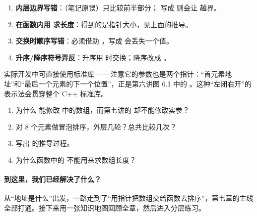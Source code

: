 \begin{warningbox}
\begin{enumerate}
  \item \textbf{内层边界写错}：（笔记原误）只比较前半部分； 写成  则会让  越界。
  \item \textbf{在函数内用  求长度}：得到的是指针大小，见上面的推导。
  \item \textbf{交换时顺序写错}：必须借助 ，写成  会丢失一个值。
  \item \textbf{升序/降序符号弄反}：升序用 \cc{>} 时交换；降序改成 \cc{<}。
\end{enumerate}
\end{warningbox}

\begin{extendbox}
实际开发中可直接使用标准库 ——注意它的参数也是两个指针：“首元素地址”和“最后一个元素的下一个位置”，正是第六讲图 6.1 中的 。这种“左闭右开”的表示法会贯穿整个 C++ 标准库。
\end{extendbox}

\begin{checkbox}
\begin{enumerate}[label=\arabic*.,itemsep=0pt]
  \item 为什么  能修改  中的数组，而第七讲的  却不能修改实参？
  \item 对 8 个元素做冒泡排序，外层几轮？总共比较几次？
  \item 写出  的推导过程。
  \item 为什么函数中的  不能用来求数组长度？
\end{enumerate}
\end{checkbox}

\paragraph{到这里，我们已经解决了什么？} 从“地址是什么”出发，一路走到了“用指针把数组交给函数去排序”，第七章的主线全部打通。接下来用一张知识地图回顾全章，然后进入分层练习。
